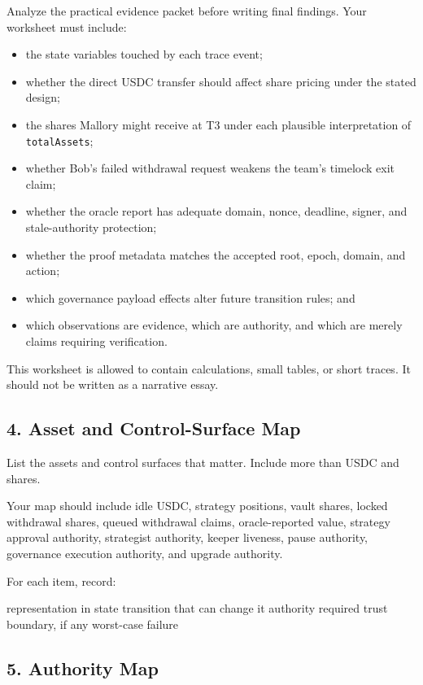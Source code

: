 Analyze the practical evidence packet before writing final findings. Your worksheet must include:

\begin{itemize}
\item the state variables touched by each trace event;
\item whether the direct USDC transfer should affect share pricing under the stated design;
\item the shares Mallory might receive at T3 under each plausible interpretation of \texttt{totalAssets};
\item whether Bob's failed withdrawal request weakens the team's timelock exit claim;
\item whether the oracle report has adequate domain, nonce, deadline, signer, and stale-authority protection;
\item whether the proof metadata matches the accepted root, epoch, domain, and action;
\item which governance payload effects alter future transition rules; and
\item which observations are evidence, which are authority, and which are merely claims requiring verification.
\end{itemize}

This worksheet is allowed to contain calculations, small tables, or short traces. It should not be written as a narrative essay.

\subsection*{4. Asset and Control-Surface Map}

List the assets and control surfaces that matter. Include more than USDC and shares.

Your map should include idle USDC, strategy positions, vault shares, locked withdrawal shares, queued withdrawal claims, oracle-reported value, strategy approval authority, strategist authority, keeper liveness, pause authority, governance execution authority, and upgrade authority.

For each item, record:

\begin{codeblock}
representation in state
transition that can change it
authority required
trust boundary, if any
worst-case failure
\end{codeblock}

\subsection*{5. Authority Map}

